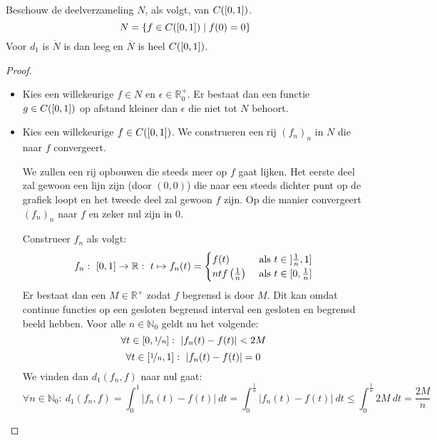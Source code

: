 \documentclass[main.tex]{subfiles}
\begin{document}
\begin{vb}
  Beschouw de deelverzameling $N$, als volgt, van $C(\interval{0}{1})$.
  \[ N = \{ f \in C(\interval{0}{1}) \mid f(0) = 0 \} \]
  Voor $d_{1}$ is $\mathring{N}$ is dan leeg en $\overline{N}$ is heel $C(\interval{0}{1})$.

  \begin{proof}
    \noindent
    \begin{itemize}
    \item 
      Kies een willekeurige $f\in N$ en $\epsilon\in \mathbb{R}_{0}^{+}$.
      Er bestaat dan een functie $g\in C(\interval{0}{1})$ op afstand kleiner dan $\epsilon$ die niet tot $N$ behoort.
    \item
      Kies een willekeurige $f\in C(\interval{0}{1})$.
      We construeren een rij $(f_{n})_{n}$ in $N$ die naar $f$ convergeert.
      \begin{klad}
        We zullen een rij opbouwen die steeds meer op $f$ gaat lijken.
        Het eerste deel zal gewoon een lijn zijn (door $(0,0)$) die naar een steeds dichter punt op de grafiek loopt en het tweede deel zal gewoon $f$ zijn.
        Op die manier convergeert $(f_{n})_{n}$ naar $f$ en zeker nul zijn in $0$.
      \end{klad}
      Construeer $f_{n}$ als volgt:
      \[ f_{n}:\ \interval{0}{1} \rightarrow \mathbb{R}:\ t \mapsto f_{n}(t) = 
      \begin{cases}
        f(t) &\text{ als } t \in \interval[open left]{\frac{1}{n}}{1}\\
        ntf\left(\frac{1}{n}\right) &\text{ als } t \in \interval{0}{\frac{1}{n}}
      \end{cases}
      \]
      Er bestaat dan een $M\in \mathbb{R}^{+}$ zodat $f$ begrensd is door $M$.
      Dit kan omdat continue functies op een gesloten begrensd interval een gesloten en begrensd beeld hebben.\needed
      Voor alle $n\in \mathbb{N}_{0}$ geldt nu het volgende:\waarom
      \[ \forall t\in \interval{0}{\nicefrac{1}{n}}:\ |f_{n}(t) - f(t)| < 2M \]
      \[ \forall t\in \interval{\nicefrac{1}{n}}{1}:\ |f_{n}(t) - f(t)| = 0 \]
      We vinden dan $d_{1}(f_{n},f)$ naar nul gaat:
      \[
      \forall n\in \mathbb{N}_{0}:\ 
      d_{1}(f_{n},f)
      = \int_{0}^{1}|f_{n}(t)-f(t)|\ dt
      = \int_{0}^{\frac{1}{n}}|f_{n}(t)-f(t)|\ dt
      \le \int_{0}^{\frac{1}{n}}2M\ dt
      = \frac{2M}{n}
      \]
    \begin{figure}[H]
      \centering
      \begin{tikzpicture}

\end{tikzpicture}
\end{figure}
\end{itemize}
\end{proof}
\end{vb}
\end{document}
